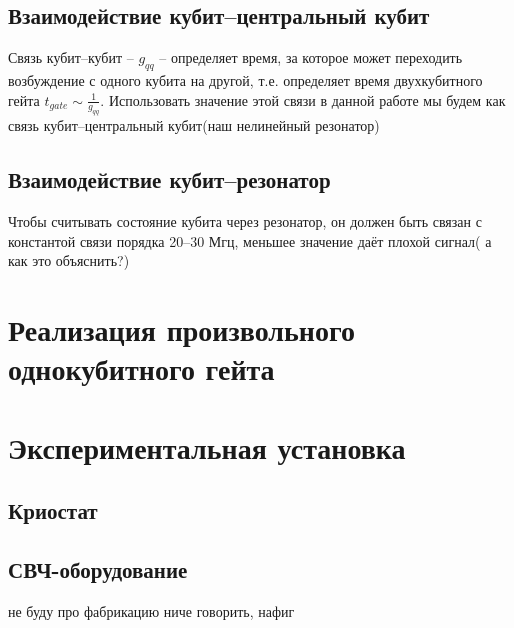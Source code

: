 \documentclass[12pt, twoside]{report}
\begin{document}
 		\subsection{Взаимодействие кубит--центральный кубит}
Связь кубит--кубит -- $g_{qq}$ -- определяет время, за которое может переходить возбуждение с одного кубита на другой, т.е. определяет время двухкубитного гейта\cite{Rigetti2010} $t_{gate}\sim \frac{1}{g_{qq}}$. Использовать значение этой связи в данной работе мы будем как связь кубит--центральный кубит(наш нелинейный резонатор) 
		
		\subsection{Взаимодействие кубит--резонатор}
Чтобы считывать состояние кубита через резонатор, он должен быть связан с константой связи порядка 20--30 Мгц,
меньшее значение даёт плохой сигнал( а как это объяснить?)

	
	
	\section{Реализация произвольного однокубитного гейта}
	
\newpage


	\section{Экспериментальная установка}
		\subsection{Криостат}
		\subsection{СВЧ-оборудование}
не буду про фабрикацию ниче говорить, нафиг
\newpage
\end{document}
